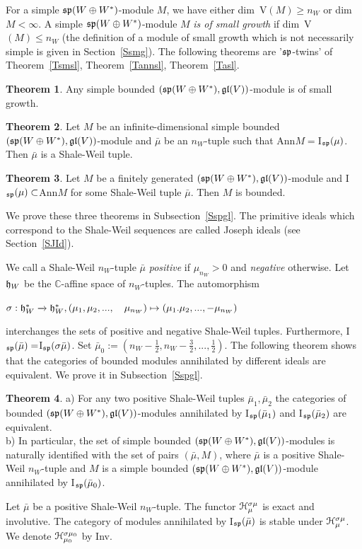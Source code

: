 \documentclass[12pt]{amsart}
\theoremstyle{definition}\newtheorem{theorem}{Theorem}[section]
\theoremstyle{definition}\newtheorem{definition}[proposition]{Definition}
\theoremstyle{remark}\newtheorem{example}[proposition]{Example}
\renewcommand{\to}[1][]{\xrightarrow{#1}}
\begin{document}
For a simple $\frak{sp}(W\oplus W^*)$-module $M$, we have either dim~V$(M)\ge n_W$ or dim$M<\infty$. A simple $\frak{sp}(W\oplus W^*)$-module $M$ {\it is of small growth} if dim~V$(M)\le n_W$ (the definition of a module of small growth which is not necessarily simple is given in Section~\ref{Ssmg}). The following theorems are '$\frak{sp}$-twins' of Theorem~\ref{Tsmsl}, Theorem~\ref{Tannsl}, Theorem~\ref{Tasl}.
\begin{theorem}\label{Tsmsp}Any simple bounded $(\frak{sp}(W\oplus W^*), \frak{gl}(V))$-module is of small growth.\end{theorem}
\begin{theorem}\label{Tannsp} Let $M$ be an infinite-dimensional simple bounded $(\frak{sp}(W\oplus W^*), \frak{gl}(V))$-module and $\bar\mu$ be
an $n_W$-tuple such that Ann$M=$I$_\frak{sp}(\mu)$. Then $\bar\mu$ is a Shale-Weil tuple.\end{theorem}
\begin{theorem}\label{Tasp}Let $M$ be a finitely generated $(\frak{sp}(W\oplus W^*), \frak{gl}(V))$-module and I$_\frak{sp}(\mu)\subset$Ann$M$ for some Shale-Weil tuple $\bar\mu$. Then $M$ is bounded.\end{theorem}
We prove these three theorems in Subsection~\ref{Sspgl}. The primitive ideals which correspond to the Shale-Weil sequences are called Joseph ideals (see Section~\ref{SJId}).

We call a Shale-Weil $n_W$-tuple $\bar\mu$ {\it positive} if $\mu_{n_W}>0$ and {\it negative} otherwise. Let $\frak h_W$ be the $\mathbb C$-affine space of $n_W$-tuples. The automorphism \begin{center}$\sigma:\frak h_W^*\to\frak h_W^*, (\mu_1, \mu_2,...,\hspace{10pt} \mu_{n_W})\mapsto (\mu_1. \mu_2, ..., -\mu_{n_W})$\end{center} interchanges the sets of positive and negative Shale-Weil tuples. Furthermore, I$_\frak{sp}(\bar\mu)=$I$_\frak{sp}(\sigma\bar\mu)$. Set $\bar\mu_0:=(n_W-\frac{1}{2}, n_W-\frac{3}{2},..., \frac{1}{2})$. The following theorem shows that the categories of bounded modules annihilated by different ideals are equivalent. We prove it in Subsection~\ref{Sspgl}.
\begin{theorem}\label{Tspeq}a) For any two positive Shale-Weil tuples $\bar\mu_1, \bar\mu_2$ the categories of bounded $(\frak{sp}(W\oplus W^*), \frak{gl}(V))$-modules annihilated by I$_\frak{sp}(\bar\mu_1)$ and I$_\frak{sp}(\bar\mu_2)$ are equivalent.\\b) In particular, the set of simple bounded $(\frak{sp}(W\oplus W^*), \frak{gl}(V))$-modules is naturally identified with the set of pairs $(\bar\mu, M)$, where $\bar\mu$ is a positive Shale-Weil $n_W$-tuple and $M$ is a simple bounded $(\frak{sp}(W\oplus W^*), \frak{gl}(V))$-module annihilated by I$_\frak{sp}(\bar\mu_0)$.\end{theorem}
Let $\bar\mu$ be a positive Shale-Weil $n_W$-tuple. The functor $\EuScript H_{\mu}^{\sigma\mu}$ is exact and involutive. The category of modules annihilated by I$_\frak{sp}(\bar\mu)$ is stable under $\EuScript H_\mu^{\sigma\mu}$. We denote $\EuScript H_{\mu_0}^{\sigma\mu_0}$ by Inv.
\end{document}
